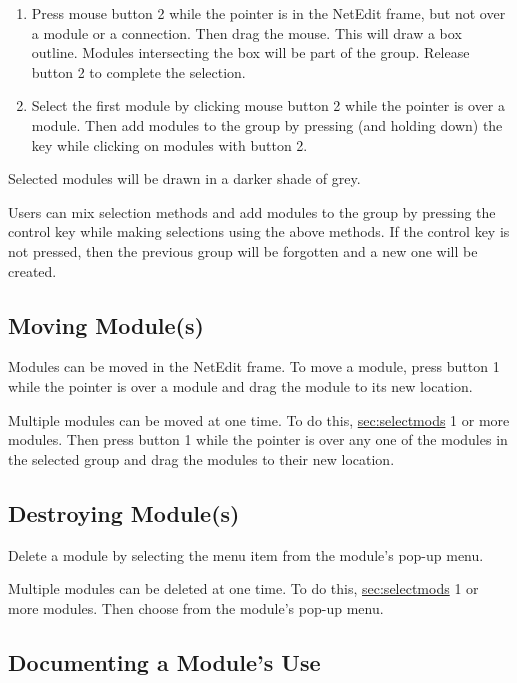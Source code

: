 \begin{enumerate}
\item Press mouse button 2 while the pointer is in the NetEdit frame,
  but not over a module or a connection.  Then drag the mouse.  This
  will draw a box outline.  Modules intersecting the box will be part
  of the group.  Release button 2 to complete the selection.
\item Select the first module by clicking mouse button 2 while the
  pointer is over a module.  Then add modules to the group by pressing
  (and holding down) the  key while clicking on
  modules with button 2.
\end{enumerate}

Selected modules will be drawn in a darker shade of grey.

Users can mix selection methods and  add modules to the group by
pressing the control key while making selections using the above methods.
If  the control key is not pressed, then the previous group will be
forgotten and a new one will be created.

\subsection{Moving Module(s)}
\label{sec:movemod}

Modules can be moved in the NetEdit frame.  To move a module,
press button 1 while the pointer is over a module and drag the module to
its new location.

Multiple modules can be moved at one time.  To do this,
\hyperref{select}{select (see Section~}{)}{sec:selectmods} 1 or more
modules. Then press button 1 while the pointer is over any one of the
modules in the selected group and drag the modules to their new location.


\subsection{Destroying Module(s)}
\label{sec:destroymod}

Delete a module by selecting the  menu item from the
module's pop-up menu.

Multiple modules can be deleted at one time.  To do this,
\hyperref{select}{select (see Section~}{)}{sec:selectmods} 1 or more
modules. Then choose   from the module's pop-up menu.
 


\subsection{Documenting a Module's Use}
\label{sec:docmodule}

